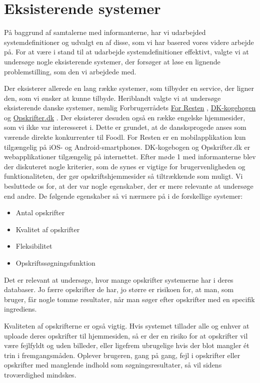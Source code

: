 \section{Eksisterende systemer}
\label{sec:eksisterendesystemer}

På baggrund af samtalerne med informanterne, har vi udarbejded systemdefinitioner og udvalgt en af disse, som vi har basered vores videre arbejde på. For at være i stand til at udarbejde systemdefinitioner effektivt, valgte vi at undersøge nogle eksisterende systemer, der forsøger at løse en lignende problemstilling, som den vi arbejdede med.

Der eksisterer allerede en lang række systemer, som tilbyder en service, der ligner den, som vi ønsker at kunne tilbyde. Heriblandt valgte vi at undersøge  eksisterende danske systemer, nemlig Forbrugerrådets \href{https://play.google.com/store/apps/details?id=com.nodes.forresten}{For Resten} \cite{forresten}, \href{http://dk-kogebogen.dk/}{DK-kogebogen} \cite{dkkogebogen} og \href{http://opskrifter.dk/}{Opskrifter.dk} \cite{opskrifterdk}. Der eksisterer desuden også en række engelske hjemmesider, som vi ikke var interesseret i. Dette er grundet, at de dansksprogede anses som værende direkte konkurrenter til Foodl. For Resten er en mobilapplikation kun tilgængelig på iOS- og Android-smartphones. DK-kogebogen og Opskrifter.dk er webapplikationer tilgængelig på internettet. Efter møde 1 med informanterne blev der diskuteret nogle kriterier, som de synes er vigtige for brugervenligheden og funktionaliteten, der gør opskriftshjemmesider så tiltrækkende som muligt. Vi besluttede os for, at der var nogle egenskaber, der er mere relevante at undersøge end andre. De følgende egenskaber så vi nærmere på i de forskellige systemer:

\begin{itemize}[noitemsep]
  \item Antal opskrifter
  \item Kvalitet af opskrifter
  \item Fleksibilitet
  \item Opskriftssøgningsfunktion
\end{itemize}

Det er relevant at undersøge, hvor mange opskrifter systemerne har i deres databaser. Jo færre opskrifter de har, jo større er risikoen for, at man, som bruger, får nogle tomme resultater, når man søger efter opskrifter med en specifik ingrediens. 

Kvaliteten af opskrifterne er også vigtig. Hvis systemet tillader alle og enhver at uploade deres opskrifter til hjemmesiden, så er der en risiko for at opskrifter vil være fejlfyldt og uden billeder, eller ligefrem ubrugelige hvis der blot mangler \'{e}t trin i fremgangsmåden. Oplever brugeren, gang på gang, fejl i opskrifter eller opskrifter med manglende indhold som søgningsresultater, så vil sidens troværdighed mindskes. 

